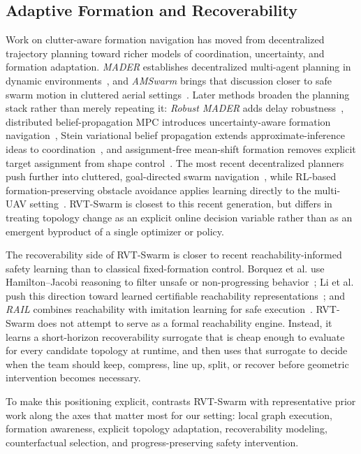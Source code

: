 \documentclass[journal]{IEEEtran}
\begin{document}
\subsection{Adaptive Formation and Recoverability}
Work on clutter-aware formation navigation has moved from decentralized
trajectory planning toward richer models of coordination, uncertainty,
and formation adaptation. \emph{MADER} establishes decentralized
multi-agent planning in dynamic environments~\cite{tordesillas2022mader},
and \emph{AMSwarm} brings that discussion closer to safe swarm motion in
cluttered aerial settings~\cite{adajania2023amswarm}. Later methods
broaden the planning stack rather than merely repeating it:
\emph{Robust MADER} adds delay robustness~\cite{kondo2024robust_mader},
distributed belief-propagation MPC introduces uncertainty-aware
formation navigation~\cite{jiang2024belief_mpc_formation}, Stein
variational belief propagation extends approximate-inference ideas to
coordination~\cite{pavlasek2024stein_belief}, and assignment-free
mean-shift formation removes explicit target assignment from shape
control~\cite{zhang2024mean_shift_shape}. The most recent decentralized
planners push further into cluttered, goal-directed swarm
navigation~\cite{park2025goal_convergence,senbaslar2025dream}, while
RL-based formation-preserving obstacle avoidance applies learning
directly to the multi-UAV setting~\cite{xie2025multi_uav_formation_rl}.
RVT-Swarm is closest to this recent generation, but differs in treating
topology change as an explicit online decision variable rather than as
an emergent byproduct of a single optimizer or policy.

The recoverability side of RVT-Swarm is closer to recent
reachability-informed safety learning than to classical fixed-formation
control. Borquez et al. use Hamilton--Jacobi reasoning to filter unsafe
or non-progressing behavior~\cite{borquez2024hj_filtering}; Li et al.
push this direction toward learned certifiable reachability
representations~\cite{li2025certifiable_reachability}; and
\emph{RAIL} combines reachability with imitation learning for safe
execution~\cite{jung2025rail}. RVT-Swarm does not attempt to serve as a
formal reachability engine. Instead, it learns a short-horizon
recoverability surrogate that is cheap enough to evaluate for every
candidate topology at runtime, and then uses that surrogate to decide
when the team should keep, compress, line up, split, or recover before
geometric intervention becomes necessary.

To make this positioning explicit,  contrasts
RVT-Swarm with representative prior work along the axes that matter most
for our setting: local graph execution, formation awareness,
explicit topology adaptation, recoverability modeling, counterfactual
selection, and progress-preserving safety intervention.
\end{document}
